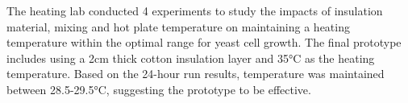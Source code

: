 The heating lab conducted 4 experiments to study the impacts of insulation material, mixing and hot plate temperature on maintaining a heating temperature within the optimal range for yeast cell growth. The final prototype includes using a 2cm thick cotton insulation layer and 35\si{\celsius} as the heating temperature. Based on the 24-hour run results, temperature was maintained between 28.5-29.5\si{\celsius}, suggesting the prototype to be effective.